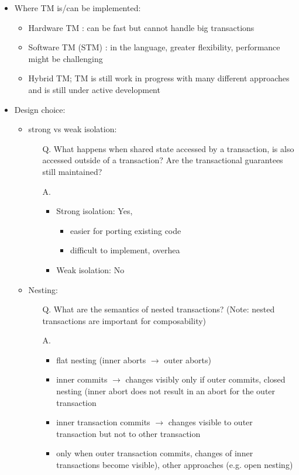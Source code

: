 \documentclass[a4paper]{article}
\begin{document}
\begin{itemize}
\begin{itemize}
\end{itemize}
\item Where TM is/can be implemented: 
\begin{itemize}
\item Hardware TM : can be fast but cannot handle big transactions
\item Software TM (STM) : in the language, greater flexibility, performance might be challenging
\item Hybrid TM; TM is still work in progress with many different approaches and is still under active development
\end{itemize}
\item Design choice: 
\begin{itemize}
\item strong vs weak isolation:
\begin{enumerate}
\item[Q.] What happens when shared state accessed by a transaction, is also accessed outside of a transaction? Are the transactional guarantees still maintained? 
\item[A.]
\begin{itemize}
\item Strong isolation: Yes, 
\begin{itemize}
\item easier for porting existing code
\item difficult to implement, overhea
\end{itemize}
\item Weak isolation: No
\end{itemize}
\end{enumerate}
\item Nesting:
\begin{enumerate}
\item[Q.] What are the semantics of nested transactions? (Note: nested transactions are important for composability)
\item[A.]
\begin{itemize}
\item flat nesting (inner aborts $\rightarrow$ outer aborts)
\item inner commits $\rightarrow$ changes visibly only if outer commits, closed nesting (inner abort does not result in an abort for the outer transaction
\item inner transaction commits $\rightarrow$ changes visible to outer transaction but not to other transaction
\item only when outer transaction commits, changes of inner transactions become visible), other approaches (e.g. open nesting)

\end{itemize}
\end{enumerate}
\end{itemize}
\end{itemize}
\end{document}
